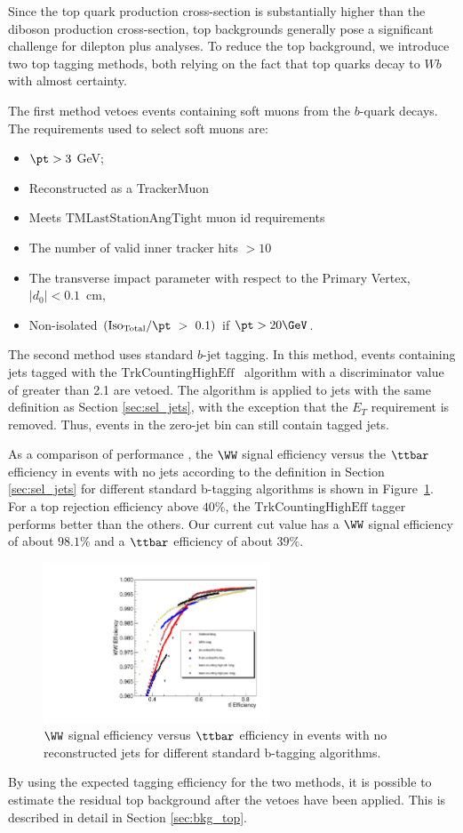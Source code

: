 
Since the top quark production cross-section is substantially higher than the
diboson production cross-section, top backgrounds generally pose a significant 
challenge for dilepton plus \met analyses. To reduce the top background, 
we introduce two top tagging methods, both relying on the fact that top quarks 
decay to $Wb$ with almost certainty.

The first method vetoes events
containing soft muons from the $b$-quark decays.
The requirements used to select soft muons are:

\begin{itemize}
    \item $\pt > 3$ GeV;
    \item Reconstructed as a TrackerMuon
    \item Meets $\mathrm{TMLastStationAngTight}$ muon id requirements
    \item The number of valid inner tracker hits $>10$
    \item The transverse impact parameter with respect to the Primary Vertex, $|d_{0}| < 0.1$~cm,
    \item Non-isolated $({\rm{Iso}_{Total}}/{\pt}~>~0.1)$ if $\pt>20\GeV$.
\end{itemize}

The second method uses standard $b$-jet tagging.
In this method, events containing jets tagged with
 the $\mathrm{TrkCountingHighEff}$~\cite{btag} algorithm with
a discriminator value of greater than 2.1 are vetoed.
The algorithm is applied to jets with the same definition as Section \ref{sec:sel_jets},
with the exception that the $E_T$ requirement is removed. 
Thus, events in the zero-jet bin can still contain tagged jets.

As a comparison of performance , the $\WW$ signal efficiency versus the $\ttbar$ efficiency in 
events with no jets according to the definition in Section \ref{sec:sel_jets} for different 
standard b-tagging algorithms  is shown in Figure~\ref{fig:eff_btag_tt_ww}. 
For a top rejection efficiency above $40\%$,
the $\mathrm{TrkCountingHighEff}$ tagger performs better than the others.
Our current cut value has a $\WW$ signal efficiency of about $98.1\%$ and
a $\ttbar$ efficiency of about $39\%$.

\begin{figure}[!htbp]
\begin{center}
\includegraphics[width=0.60\textwidth]{figures/eff_btag_tt_ww.pdf}
\caption{$\WW$ signal efficiency versus $\ttbar$ efficiency in events with no
reconstructed jets for different standard b-tagging algorithms.}
\label{fig:eff_btag_tt_ww}
\end{center}
\end{figure}

By using the expected tagging efficiency for the two methods,
it is possible to estimate the residual top background after the vetoes
have been applied.
This is described in detail in Section \ref{sec:bkg_top}.

